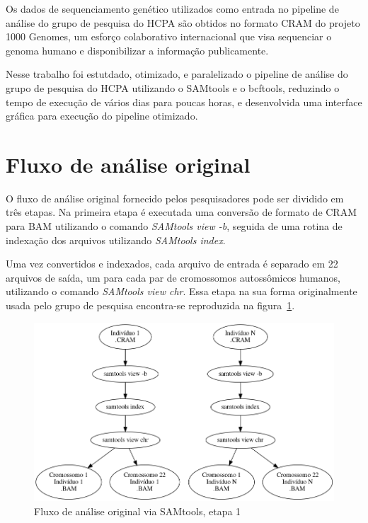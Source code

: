 \documentclass[cic,tc]{iiufrgs}
\begin{document}
Os dados de sequenciamento genético utilizados como entrada no pipeline de
análise do grupo de pesquisa do HCPA são obtidos no formato CRAM do projeto
1000 Genomes, um esforço colaborativo internacional que visa sequenciar o
genoma humano e disponibilizar a informação publicamente.\cite{via20101000}

Nesse trabalho foi estutdado, otimizado, e paralelizado o pipeline de análise
do grupo de pesquisa do HCPA utilizando o SAMtools e o bcftools, reduzindo o
tempo de execução de vários dias para poucas horas, e desenvolvida uma
interface gráfica para execução do pipeline otimizado.

\section{Fluxo de análise original}

O fluxo de análise original fornecido pelos pesquisadores pode ser dividido
em três etapas. Na primeira etapa é executada uma conversão de formato de CRAM
para BAM utilizando o comando \textit{SAMtools view -b}, seguida de uma rotina
de indexação dos arquivos utilizando \textit{SAMtools index}.

Uma vez convertidos e indexados, cada arquivo de entrada é separado em 22
arquivos de saída, um para cada par de cromossomos autossômicos humanos,
utilizando o comando \textit{SAMtools view chr}. Essa etapa na sua forma
originalmente usada pelo grupo de pesquisa encontra-se reproduzida na
figura~\ref{fig:stage1_orig}.

\begin{figure}
  \caption{Fluxo de análise original via SAMtools, etapa 1}
    \begin{center}
      \includegraphics[width=0.85\linewidth]{img/stage1_orig.png}
    \end{center}
    \label{fig:stage1_orig}
\end{figure}
\end{document}

